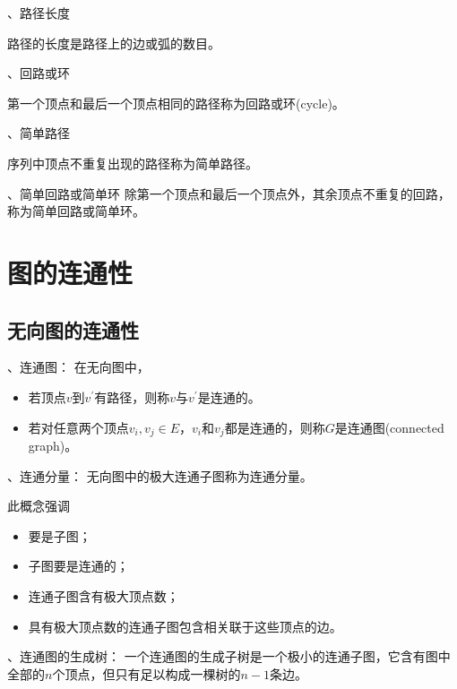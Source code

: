 \documentclass[10pt]{article}
\begin{document}
、路径长度

路径的长度是路径上的边或弧的数目。
 
、回路或环

第一个顶点和最后一个顶点相同的路径称为回路或环(cycle)。

、简单路径

序列中顶点不重复出现的路径称为简单路径。

、简单回路或简单环
除第一个顶点和最后一个顶点外，其余顶点不重复的回路，称为简单回路或简单环。
 
\begin{figure}
\centering

\end{figure}

\section{图的连通性}

\subsection{无向图的连通性}

、连通图： 在无向图中，
\begin{itemize}
\item 
若顶点$v$到$v^\prime$有路径，则称$v$与$v^\prime$是连通的。  
\item
若对任意两个顶点$v_i,v_j\in E$，$v_i$和$v_j$都是连通的，则称$G$是连通图(connected graph)。
\end{itemize}
\begin{figure}
\centering

\end{figure}

、连通分量： 
无向图中的极大连通子图称为连通分量。

此概念强调 
\begin{itemize}
\item 
要是子图；  
\item
子图要是连通的； 
\item
连通子图含有极大顶点数； 
\item
具有极大顶点数的连通子图包含相关联于这些顶点的边。
\end{itemize}


\begin{figure}
\centering

\end{figure}

、连通图的生成树：
一个连通图的生成子树是一个极小的连通子图，它含有图中全部的$n$个顶点，但只有足以构成一棵树的$n-1$条边。
 
\end{document}

